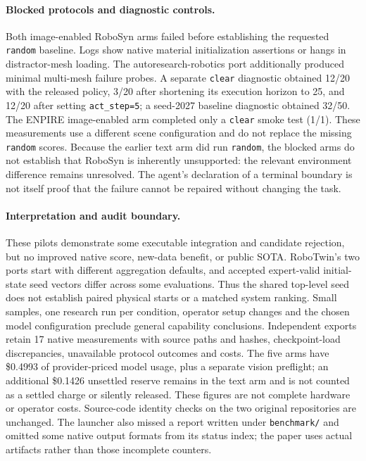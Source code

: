 \documentclass[10pt,twocolumn,letterpaper]{article}
\begin{document}
\paragraph{Blocked protocols and diagnostic controls.}
Both image-enabled RoboSyn arms failed before establishing the requested
\texttt{random} baseline. Logs show native material initialization assertions or
hangs in distractor-mesh loading. The autoresearch-robotics port additionally
produced minimal multi-mesh failure probes. A separate \texttt{clear} diagnostic
obtained 12/20 with the released policy, 3/20 after shortening its execution
horizon to 25, and 12/20 after setting \texttt{act\_step=5}; a seed-2027 baseline
diagnostic obtained 32/50. The ENPIRE image-enabled arm completed only a
\texttt{clear} smoke test (1/1). These measurements use a different scene
configuration and do not replace the missing \texttt{random} scores. Because the
earlier text arm did run \texttt{random}, the blocked arms do not establish that
RoboSyn is inherently unsupported: the relevant environment difference remains
unresolved. The agent's declaration of a terminal boundary is not itself proof
that the failure cannot be repaired without changing the task.

\paragraph{Interpretation and audit boundary.}
These pilots demonstrate some executable integration and candidate rejection,
but no improved native score, new-data benefit, or public SOTA. RoboTwin's two
ports start with different aggregation defaults, and accepted expert-valid
initial-state seed vectors differ across some evaluations. Thus the shared
top-level seed does not establish paired physical starts or a matched system
ranking. Small samples, one research run per condition, operator setup changes
and the chosen model configuration preclude general capability conclusions.
Independent exports retain 17 native measurements with source paths and hashes,
checkpoint-load discrepancies, unavailable protocol outcomes and costs. The
five arms have \$0.4993 of provider-priced model usage, plus a separate vision
preflight; an additional \$0.1426 unsettled reserve remains in the text arm and
is not counted as a settled charge or silently released. These figures are not
complete hardware or operator costs. Source-code identity checks on the two
original repositories are unchanged. The launcher also missed a report written
under \texttt{benchmark/} and omitted some native output formats from its status
index; the paper uses actual artifacts rather than those incomplete counters.
\end{document}
